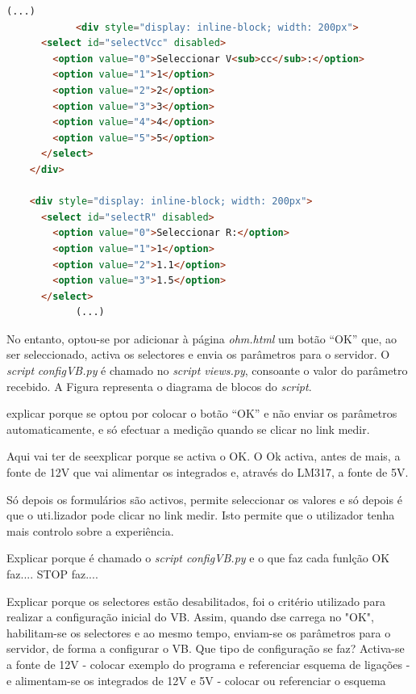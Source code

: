 \begin{center}
	\begin{minipage}{0.7\linewidth}
		\begin{lstlisting}[language=html, caption=Formulário de escolha na página \textit{ohm.html},label=lst:formularioescolha]
			(...)
			<div style="display: inline-block; width: 200px">
      <select id="selectVcc" disabled>
        <option value="0">Seleccionar V<sub>cc</sub>:</option>
        <option value="1">1</option>
        <option value="2">2</option>
        <option value="3">3</option>
        <option value="4">4</option>
        <option value="5">5</option>
      </select>
    </div>

    <div style="display: inline-block; width: 200px">
      <select id="selectR" disabled>
        <option value="0">Seleccionar R:</option>
        <option value="1">1</option>
        <option value="2">1.1</option>
        <option value="3">1.5</option>
      </select>
			(...)
	\end{lstlisting}
	\end{minipage}
\end{center}

No entanto, optou-se por adicionar à página \textit{ohm.html} um botão ``OK'' que, ao ser seleccionado, activa os selectores e envia os parâmetros para o servidor. O \textit{script} \textit{configVB.py} é chamado no \textit{script views.py}, consoante o valor do parâmetro recebido. A Figura  representa o diagrama de blocos do \textit{script}.

explicar porque se optou por colocar o botão ``OK'' e não enviar os parâmetros automaticamente, e só efectuar a medição quando se clicar no link medir.

Aqui vai ter de seexplicar porque se activa o OK. O Ok activa, antes de mais, a fonte de 12V que vai alimentar os integrados e, através do LM317, a fonte de 5V. 

Só depois os formulários são activos, permite seleccionar os valores e só depois é que o uti.lizador pode clicar no link medir.
Isto permite que o utilizador tenha mais controlo sobre a experiência.

Explicar porque é chamado o \textit{script configVB.py} e o que faz cada funlção
OK faz....
STOP faz....

Explicar porque os selectores estão desabilitados, foi o critério utilizado para realizar a configuração inicial do VB. Assim, quando dse carrega no "OK", habilitam-se os selectores e ao mesmo tempo, enviam-se os parâmetros para o servidor, de forma a configurar o VB. Que tipo de configuração se faz? Activa-se a fonte de 12V - colocar exemplo do programa e referenciar esquema de ligações - e alimentam-se os integrados de 12V e 5V - colocar ou referenciar o esquema

